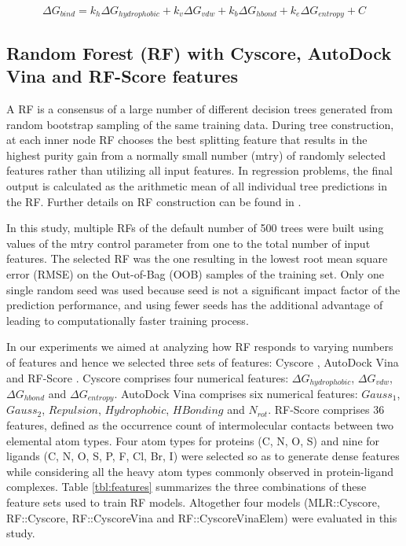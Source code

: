 \documentclass[journal=jacsat,manuscript=article]{achemso}
\begin{document}
\begin{equation}
\Delta G_{bind} = k_h\Delta G_{hydrophobic} + k_v\Delta G_{vdw} + k_b\Delta G_{hbond} + k_e\Delta G_{entropy} + C
\label{eqn:cyscore}
\end{equation}

\subsection{Random Forest (RF) with Cyscore, AutoDock Vina and RF-Score features}

A RF \cite{1309} is a consensus of a large number of different decision trees generated from random bootstrap sampling of the same training data. During tree construction, at each inner node RF chooses the best splitting feature that results in the highest purity gain from a normally small number (mtry) of randomly selected features rather than utilizing all input features. In regression problems, the final output is calculated as the arithmetic mean of all individual tree predictions in the RF. Further details on RF construction can be found in \cite{564,1362}.

In this study, multiple RFs of the default number of 500 trees were built using values of the mtry control parameter from one to the total number of input features. The selected RF was the one resulting in the lowest root mean square error (RMSE) on the Out-of-Bag (OOB) samples of the training set. Only one single random seed was used because seed is not a significant impact factor of the prediction performance, and using fewer seeds has the additional advantage of leading to computationally faster training process.

In our experiments we aimed at analyzing how RF responds to varying numbers of features and hence we selected three sets of features: Cyscore \cite{1372}, AutoDock Vina \cite{595} and RF-Score \cite{564}. Cyscore comprises four numerical features: $\Delta G_{hydrophobic}$, $\Delta G_{vdw}$, $\Delta G_{hbond}$ and $\Delta G_{entropy}$. AutoDock Vina comprises six numerical features: $Gauss_1$, $Gauss_2$, $Repulsion$, $Hydrophobic$, $HBonding$ and $N_{rot}$. RF-Score comprises 36 features, defined as the occurrence count of intermolecular contacts between two elemental atom types. Four atom types for proteins (C, N, O, S) and nine for ligands (C, N, O, S, P, F, Cl, Br, I) were selected so as to generate dense features while considering all the heavy atom types commonly observed in protein-ligand complexes. Table \ref{tbl:features} summarizes the three combinations of these feature sets used to train RF models. Altogether four models (MLR::Cyscore, RF::Cyscore, RF::CyscoreVina and RF::CyscoreVinaElem) were evaluated in this study.
\end{document}
